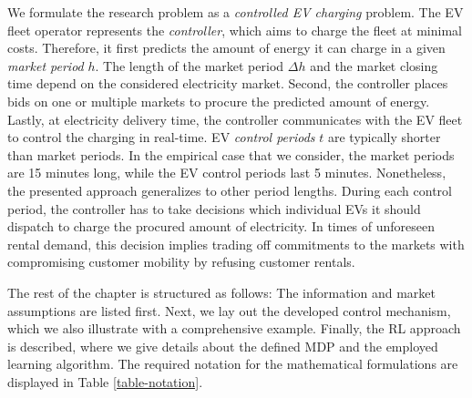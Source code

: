 \documentclass[a4paper, 12pt]{article}
\begin{document}
We formulate the research problem as a \emph{controlled EV charging} problem. The EV
fleet operator represents the \emph{controller}, which aims to charge the fleet at
minimal costs. Therefore, it first predicts the amount of energy it can charge
in a given \emph{market period} \(h\). The length of the market period \(\Delta h\) and
the market closing time depend on the considered electricity market. Second, the
controller places bids on one or multiple markets to procure the predicted
amount of energy. Lastly, at electricity delivery time, the controller
communicates with the EV fleet to control the charging in real-time. EV \emph{control
periods} \(t\) are typically shorter than market periods. In the empirical case
that we consider, the market periods are 15 minutes long, while the EV control
periods last 5 minutes. Nonetheless, the presented approach generalizes to other
period lengths. During each control period, the controller has to take decisions
which individual EVs it should dispatch to charge the procured amount of
electricity. In times of unforeseen rental demand, this decision implies trading
off commitments to the markets with compromising customer mobility by refusing
customer rentals.

The rest of the chapter is structured as follows: The information and market
assumptions are listed first. Next, we lay out the developed control mechanism,
which we also illustrate with a comprehensive example. Finally, the RL approach
is described, where we give details about the defined MDP and the employed
learning algorithm. The required notation for the mathematical formulations are
displayed in Table \ref{table-notation}.
\end{document}
